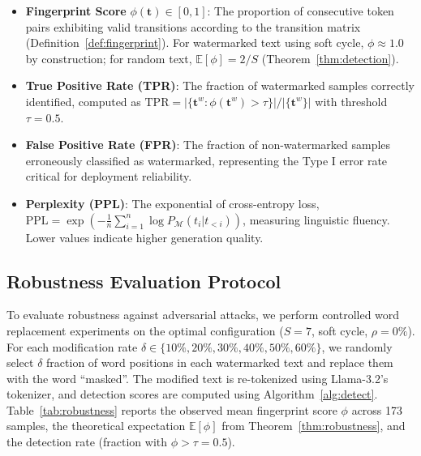 \documentclass[11pt]{article}
\theoremstyle{definition}
\theoremstyle{remark}
\begin{document}
\begin{itemize}
    \item \textbf{Fingerprint Score} $\phi(\mathbf{t}) \in [0,1]$: The proportion of consecutive token pairs exhibiting valid transitions according to the transition matrix (Definition~\ref{def:fingerprint}). For watermarked text using soft cycle, $\phi \approx 1.0$ by construction; for random text, $\mathbb{E}[\phi] = 2/S$ (Theorem~\ref{thm:detection}).
    
    \item \textbf{True Positive Rate (TPR)}: The fraction of watermarked samples correctly identified, computed as $\text{TPR} = |\{\mathbf{t}^w : \phi(\mathbf{t}^w) > \tau\}| / |\{\mathbf{t}^w\}|$ with threshold $\tau = 0.5$.
    
    \item \textbf{False Positive Rate (FPR)}: The fraction of non-watermarked samples erroneously classified as watermarked, representing the Type I error rate critical for deployment reliability.
    
    \item \textbf{Perplexity (PPL)}: The exponential of cross-entropy loss, $\text{PPL} = \exp\left(-\frac{1}{n}\sum_{i=1}^{n} \log P_{\mathcal{M}}(t_i | t_{<i})\right)$, measuring linguistic fluency. Lower values indicate higher generation quality.
\end{itemize}

\subsection{Robustness Evaluation Protocol}

To evaluate robustness against adversarial attacks, we perform controlled word replacement experiments on the optimal configuration ($S = 7$, soft cycle, $\rho = 0\%$). For each modification rate $\delta \in \{10\%, 20\%, 30\%, 40\%, 50\%, 60\%\}$, we randomly select $\delta$ fraction of word positions in each watermarked text and replace them with the word ``masked''. The modified text is re-tokenized using Llama-3.2's tokenizer, and detection scores are computed using Algorithm~\ref{alg:detect}. Table~\ref{tab:robustness} reports the observed mean fingerprint score $\phi$ across 173 samples, the theoretical expectation $\mathbb{E}[\phi]$ from Theorem~\ref{thm:robustness}, and the detection rate (fraction with $\phi > \tau = 0.5$).

\end{document}

